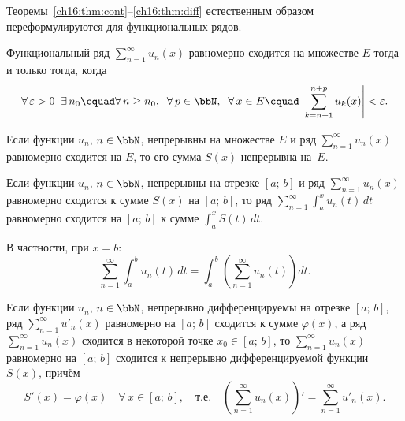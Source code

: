 Теоремы~\ref{ch16:thm:cont}--\ref{ch16:thm:diff} естественным образом переформулируются для функциональных рядов.

\begin{thmn} \label{ch16:thm:cauchy_series}
Функциональный ряд $\sum\limits_{n=1}^{\infty} u_n(x)$ равномерно сходится на множестве $E$ тогда и только тогда, когда
$$
\forall\, \varepsilon > 0 \;\; \exists\, n_0 \cquad \forall\, n \ge n_0, \;\; \forall\, p \in \bbN, \;\; \forall\, x \in E \cquad \left|\sum_{k=n+1}^{n+p} u_k(x)\right| < \varepsilon.
$$
\end{thmn}

\begin{thmn} \label{ch16:thm:cont_series}
Если функции $u_n$, $n \in \bbN$, непрерывны на множестве $E$ и ряд $\sum\limits_{n=1}^{\infty} u_n(x)$ равномерно сходится на $E$, то его сумма $S(x)$ непрерывна на~$E$.
\end{thmn}

\begin{thmn} \label{ch16:thm:int_series}
Если функции $u_n$, $n \in \bbN$, непрерывны на отрезке $[a;\, b]$ и ряд $\sum\limits_{n=1}^{\infty} u_n(x)$ равномерно сходится к сумме $S(x)$ на $[a;\, b]$, то ряд $\sum\limits_{n=1}^{\infty} \int_a^x u_n(t)\,dt$ равномерно сходится на $[a;\, b]$ к сумме $\int_a^x S(t)\,dt$.

В частности, при $x = b$:
$$
\sum_{n=1}^{\infty} \int_a^b u_n(t)\,dt = \int_a^b \left(\sum_{n=1}^{\infty} u_n(t)\right) dt.
$$
\end{thmn}

\begin{thmn} \label{ch16:thm:diff_series}
Если функции $u_n$, $n \in \bbN$, непрерывно дифференцируемы на отрезке $[a;\, b]$, ряд $\sum\limits_{n=1}^{\infty} u'_n(x)$ равномерно на $[a;\, b]$ сходится к сумме $\varphi(x)$, а ряд $\sum\limits_{n=1}^{\infty} u_n(x)$ сходится в некоторой точке $x_0 \in [a;\, b]$, то $\sum\limits_{n=1}^{\infty} u_n(x)$ равномерно на $[a;\, b]$ сходится к непрерывно дифференцируемой функции $S(x)$, причём
$$
S'(x) = \varphi(x) \quad \forall\, x \in [a;\, b], \quad \text{т.е.} \quad \left(\sum_{n=1}^{\infty} u_n(x)\right)' = \sum_{n=1}^{\infty} u'_n(x).
$$
\end{thmn}